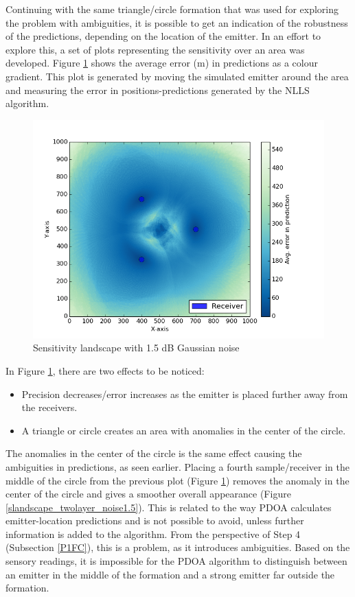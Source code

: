 \documentclass[10pt,a4paper]{book}
\begin{document}
Continuing with the same triangle/circle formation that was used for exploring the problem with ambiguities, it is possible to get an indication of the robustness of the predictions, depending on the location of the emitter. In an effort to explore this, a set of plots representing the sensitivity over an area was developed. Figure \ref{slandscape_circle_noise1.5} shows the average error (m) in predictions as a colour gradient. This plot is generated by moving the simulated emitter around the area and measuring the error in positions-predictions generated by the \gls{NLLS} algorithm. 

\begin{figure}[H]
\centering
\includegraphics[width=120mm]{slandscape_15_circle.png}
\caption{Sensitivity landscape with 1.5 dB Gaussian noise}
\label{slandscape_circle_noise1.5}
\end{figure}

In Figure \ref{slandscape_circle_noise1.5}, there are two effects to be noticed:

\begin{itemize}


\item Precision decreases/error increases as the emitter is placed further away from the receivers.
\item A triangle or circle creates an area with anomalies in the center of the circle.

\end{itemize}

The anomalies in the center of the circle is the same effect causing the ambiguities in predictions, as seen earlier. Placing a fourth sample/receiver in the middle of the circle from the previous plot (Figure \ref{slandscape_circle_noise1.5}) removes the anomaly in the center of the circle and gives a smoother overall appearance (Figure \ref{slandscape_twolayer_noise1.5}). This is related to the way \gls{PDOA} calculates emitter-location predictions and is not possible to avoid, unless further information is added to the algorithm. From the perspective of Step 4 (Subsection \ref{P1FC}), this is a problem, as it introduces ambiguities. Based on the sensory readings, it is impossible for the \gls{PDOA} algorithm to distinguish between an emitter in the middle of the formation and a strong emitter far outside the formation.
\end{document}
